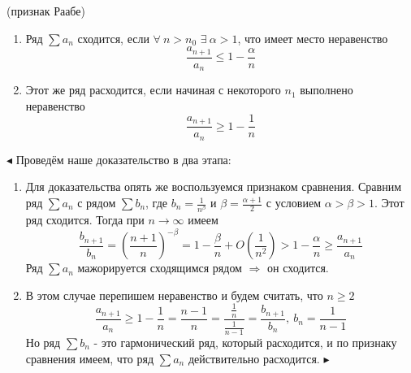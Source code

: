 \begin{theorem}(признак Раабе)
\begin{enumerate}
\item Ряд $\sum{a_n}$ сходится, если $\forall\ n>n_0$ $\exists\ \alpha>1$, что имеет место неравенство
$$\frac{a_{n+1}}{a_n}\le1-\frac{\alpha}{n}$$ 
\item Этот же ряд расходится, если начиная с некоторого $n_1$ выполнено неравенство
$$\frac{a_{n+1}}{a_n}\ge1-\frac{1}{n}$$
\end{enumerate}
\end{theorem}
$\blacktriangleleft$ Проведём наше доказательство в два этапа:
\begin{enumerate}
\item Для доказательства опять же воспользуемся признаком сравнения. Сравним ряд $\sum{a_n}$ с рядом $\sum{b_n}$, где $b_n=\frac{1}{n^\beta}$ и $\beta=\frac{\alpha+1}{2}$ с условием $\alpha>\beta>1$. Этот ряд сходится. Тогда при $n\to\infty$ имеем
$$\frac{b_{n+1}}{b_n}=\left(\frac{n+1}{n}\right)^{-\beta}=1-\frac{\beta}{n}+O\left(\frac{1}{n^2}\right)>1-\frac{\alpha}{n}\ge\frac{a_{n+1}}{a_n}$$
Ряд $\sum{a_n}$ мажорируется сходящимся рядом $\Rightarrow$ он сходится.
\item В этом случае перепишем неравенство и будем считать, что $n\ge2$
$$\frac{a_{n+1}}{a_n}\ge1-\frac{1}{n}=\frac{n-1}{n}=\frac{\frac{1}{n}}{\frac{1}{n-1}}=\frac{b_{n+1}}{b_n},\ b_n=\frac{1}{n-1}$$
Но ряд $\sum{b_n}$ - это гармонический ряд, который расходится, и по признаку сравнения имеем, что ряд $\sum{a_n}$ действительно расходится. $\blacktriangleright$
\end{enumerate}


